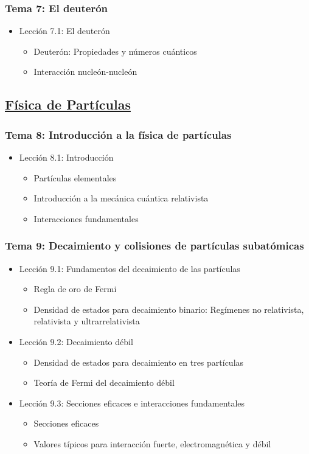 \documentclass[a4paper,12pt,twoside]{article}
\begin{document}
\subsubsection*{Tema 7: El deuterón}
\begin{itemize}
\item Lección 7.1: El deuterón
\begin{itemize}
\item Deuterón: Propiedades y números cuánticos
\item Interacción nucleón-nucleón
\end{itemize}
\end{itemize}

\subsection*{\underline{Física de Partículas}}

\subsubsection*{Tema 8: Introducción a la física de partículas}
\begin{itemize}
\item Lección 8.1: Introducción
\begin{itemize}
\item Partículas elementales
\item Introducción a la mecánica cuántica relativista
\item Interacciones fundamentales
\end{itemize}
\end{itemize}

\subsubsection*{Tema 9: Decaimiento y colisiones de partículas subatómicas}
\begin{itemize}
\item Lección 9.1: Fundamentos del decaimiento de las partículas
\begin{itemize}
\item Regla de oro de Fermi
\item Densidad de estados para decaimiento binario: Regímenes no relativista, relativista y ultrarrelativista
\end{itemize}
\item Lección 9.2: Decaimiento débil
\begin{itemize}
\item Densidad de estados para decaimiento en tres partículas
\item Teoría de Fermi del decaimiento débil
\end{itemize}
\item Lección 9.3: Secciones eficaces e interacciones fundamentales
\begin{itemize}
\item Secciones eficaces
\item Valores típicos para interacción fuerte, electromagnética y débil
\end{itemize}
\end{itemize}
\end{document}
